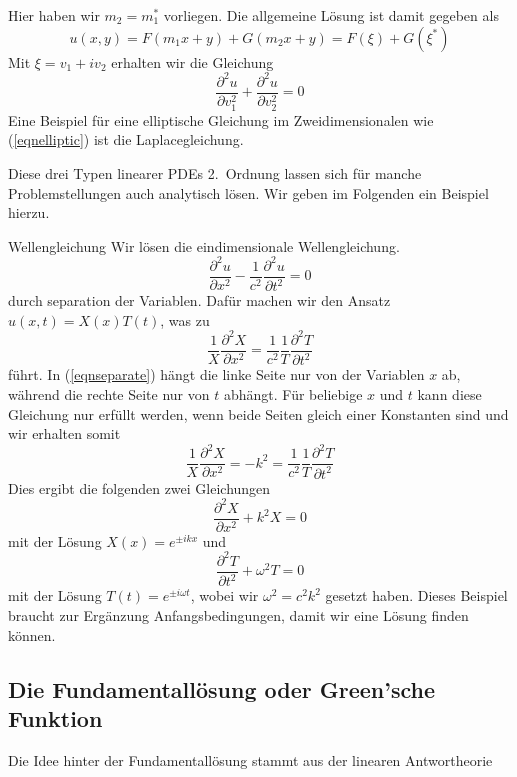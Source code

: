 \begin{description}
		Hier haben wir $m_2=m_1^*$ vorliegen. Die allgemeine Lösung
		ist damit gegeben als
		\begin{equation}
			u(x,y)=F(m_1x+y)+G(m_2x+y)=F(\xi)+G(\xi^*)
			\label{eqnsolell}
		\end{equation}
		Mit $\xi=v_1+iv_2$ erhalten wir die Gleichung
		\begin{equation}
			\frac{\partial^2 u}{\partial v_1^2}+\frac{\partial^2 u}{\partial v_2^2}=0
			\label{eqnelliptic}
		\end{equation}
		Eine Beispiel für eine elliptische Gleichung im
		Zweidimensionalen wie (\ref{eqnelliptic}) ist die
		Laplacegleichung.
\end{description}
Diese drei Typen linearer PDEs 2.\ Ordnung lassen sich für manche
Problemstellungen auch analytisch lösen. Wir geben im Folgenden ein
Beispiel hierzu.

\begin{example}{Wellengleichung}
Wir lösen die eindimensionale Wellengleichung.
\begin{equation}
	\frac{\partial^2 u}{\partial x^2}-\frac{1}{c^2}\frac{\partial^2 u}{\partial t^2}=0
	\label{eqn1Dwaveeqn}
\end{equation}
durch separation der Variablen. Dafür machen wir den Ansatz $u(x,t)=X(x)T(t)$, was zu
\begin{equation}
	\frac{1}{X}\frac{\partial^2 X}{\partial x^2}=\frac{1}{c^2}\frac{1}{T}\frac{\partial^2 T}{\partial t^2}
	\label{eqnseparate}
\end{equation}
führt.  In (\ref{eqnseparate}) hängt die linke Seite nur von der Variablen $x$ ab, während
die rechte Seite nur von $t$ abhängt. Für beliebige $x$ und $t$ kann diese
Gleichung nur erfüllt werden, wenn beide Seiten gleich einer Konstanten sind
und wir erhalten somit
\begin{equation}
        \frac{1}{X}\frac{\partial^2 X}{\partial x^2}=-k^2=\frac{1}{c^2}\frac{1}{T}\frac{\partial^2 T}{\partial t^2}
\end{equation}
Dies ergibt die folgenden zwei Gleichungen
\[\frac{\partial^2 X}{\partial x^2}+k^2X=0\]
mit der Lösung $X(x)=e^{\pm ikx}$ und
\[\frac{\partial^2 T}{\partial t^2}+\omega^2T=0\]
mit der Lösung $T(t)=e^{\pm i\omega t}$, wobei wir $\omega^2=c^2k^2$ gesetzt
haben.  Dieses Beispiel braucht zur Ergänzung Anfangsbedingungen, damit wir
eine Lösung finden können.
\end{example}
\subsection{Die Fundamentallösung oder Green'sche Funktion}
Die Idee hinter der Fundamentallösung stammt aus der linearen Antwortheorie

